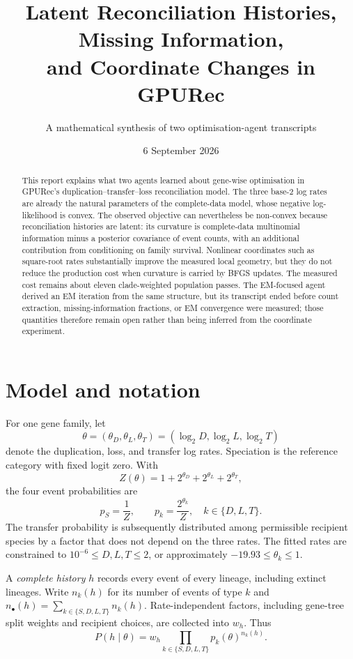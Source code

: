 \documentclass[11pt]{article}
\title{Latent Reconciliation Histories, Missing Information,\\
and Coordinate Changes in GPURec}
\author{A mathematical synthesis of two optimisation-agent transcripts}
\date{6 September 2026}
\begin{document}
\maketitle

\begin{abstract}
This report explains what two agents learned about gene-wise optimisation in GPURec's
duplication--transfer--loss reconciliation model.  The three base-2 log rates are already the
natural parameters of the complete-data model, whose negative log-likelihood is convex.  The
observed objective can nevertheless be non-convex because reconciliation histories are latent:
its curvature is complete-data multinomial information minus a posterior covariance of event
counts, with an additional contribution from conditioning on family survival.  Nonlinear
coordinates such as square-root rates substantially improve the measured local geometry, but
they do not reduce the production cost when curvature is carried by BFGS updates.  The measured
cost remains about eleven clade-weighted population passes.  The EM-focused agent derived an EM
iteration from the same structure, but its transcript ended before count extraction,
missing-information fractions, or EM convergence were measured; those quantities therefore
remain open rather than being inferred from the coordinate experiment.
\end{abstract}

\section{Model and notation}

For one gene family, let
\[
  \theta=(\theta_D,\theta_L,\theta_T)
  = (\log_2 D,\log_2 L,\log_2 T)
\]
denote the duplication, loss, and transfer log rates.  Speciation is the reference category with
fixed logit zero.  With
\[
  Z(\theta)=1+2^{\theta_D}+2^{\theta_L}+2^{\theta_T},
\]
the four event probabilities are
\begin{equation}
  p_S=\frac1Z,
  \qquad
  p_k=\frac{2^{\theta_k}}Z,
  \quad k\in\{D,L,T\}.
  \label{eq:softmax}
\end{equation}
The transfer probability is subsequently distributed among permissible recipient species by a
factor that does not depend on the three rates.  The fitted rates are constrained to
$10^{-6}\leq D,L,T\leq 2$, or approximately
$-19.93\leq\theta_k\leq1$.

A \emph{complete history} $h$ records every event of every lineage, including extinct lineages.
Write $n_k(h)$ for its number of events of type $k$ and
$n_\bullet(h)=\sum_{k\in\{S,D,L,T\}}n_k(h)$.  Rate-independent factors, including gene-tree split
weights and recipient choices, are collected into $w_h$.  Thus
\begin{equation}
  P(h\mid\theta)
  =w_h\prod_{k\in\{S,D,L,T\}}p_k(\theta)^{n_k(h)}.
  \label{eq:history-probability}
\end{equation}
\end{document}
